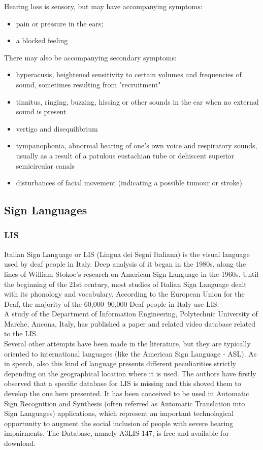 Hearing loss is sensory, but may have accompanying symptoms:\\
\begin{itemize}
	\item pain or pressure in the ears;
	\item a blocked feeling
\end{itemize}

There may also be accompanying secondary symptoms:
\begin{itemize}
	\item hyperacusis, heightened sensitivity to certain volumes and frequencies of sound, sometimes resulting from "recruitment"
	\item tinnitus, ringing, buzzing, hissing or other sounds in the ear when no external sound is present
	\item vertigo and disequilibrium
	\item tympanophonia, abnormal hearing of one's own voice and respiratory sounds, usually as a result of a patulous eustachian tube or dehiscent superior semicircular canals
	\item disturbances of facial movement (indicating a possible tumour or stroke)  
\end{itemize}

\subsection*{Sign Languages}
\subsubsection*{LIS}
Italian Sign Language or LIS (Lingua dei Segni Italiana) is the visual language used by deaf people in Italy. Deep analysis of it began in the 1980s, along the lines of William Stokoe's research on American Sign Language in the 1960s. Until the beginning of the 21st century, most studies of Italian Sign Language dealt with its phonology and vocabulary. According to the European Union for the Deaf, the majority of the 60,000–90,000 Deaf people in Italy use LIS.\\
A study of the Department of Information Engineering, Polytechnic University of Marche, Ancona, Italy, has published a paper and related video database related to the LIS. \\
Several other attempts have been made in the literature, but they are typically oriented to international languages (like the American Sign Language - ASL). As in speech, also this kind of language presents different peculiarities strictly depending on the geographical location where it is used. The authors have firstly observed that a specific database for LIS is missing and this shoved them to develop the one here presented. It has been conceived to be used in Automatic Sign Recognition and Synthesis (often referred as Automatic Translation into Sign Languages) applications, which represent an important technological opportunity to augment the social inclusion of people with severe hearing impairments. The Database, namely A3LIS-147, is free and available for download\cite{lisdatabase}. 

